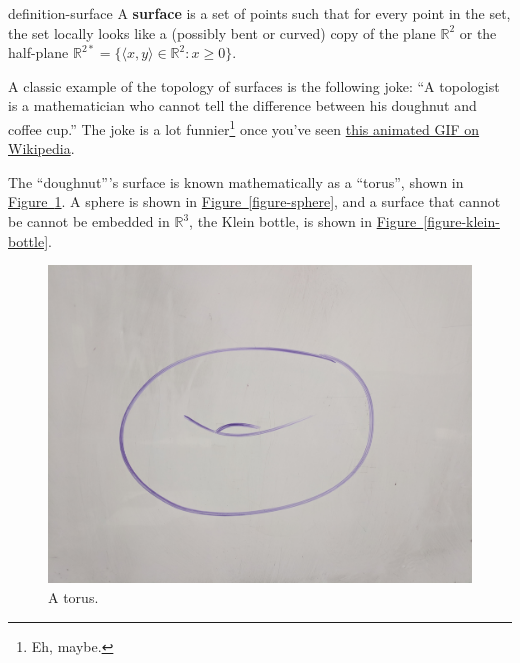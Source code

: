 \documentclass[10pt,]{article}
\newcommand{\terminology}[1]{\textbf{#1}}
\newcommand{\tuple}[1]{\langle #1 \rangle}
\newcommand{\mb}{\mathbb}
\begin{document}
\begin{definition}{}{definition-surface}%
\hypertarget{p-15}{}%
A \terminology{surface} is a set of points such that for every point in the set, the set locally looks like a (possibly bent or curved) copy of the plane \(\mathbb R^2\) or the half-plane \(\mathbb R^{2*}=\{\tuple{x,y}\in\mb R^2:x\geq 0\}\).%
\end{definition}
\hypertarget{p-16}{}%
A classic example of the topology of surfaces is the following joke: ``A topologist is a mathematician who cannot tell the difference between his doughnut and coffee cup.'' The joke is a lot funnier\footnote{Eh, maybe.\label{fn-2}} once you've seen \href{https://en.wikipedia.org/wiki/File:Mug_and_Torus_morph.gif}{this animated GIF on Wikipedia}.%
\par
\hypertarget{p-17}{}%
The ``doughnut'''s surface is known mathematically as a ``torus'', shown in \hyperref[figure-torus]{Figure~\ref{figure-torus}}. A sphere is shown in \hyperref[figure-sphere]{Figure~\ref{figure-sphere}}, and a surface that cannot be cannot be embedded in \(\mathbb R^3\), the Klein bottle, is shown in \hyperref[figure-klein-bottle]{Figure~\ref{figure-klein-bottle}}.%
\begin{figure}
\centering
\includegraphics[width=1\linewidth]{images/torus.jpg}
\caption{A torus.\label{figure-torus}}
\end{figure}
\end{document}

